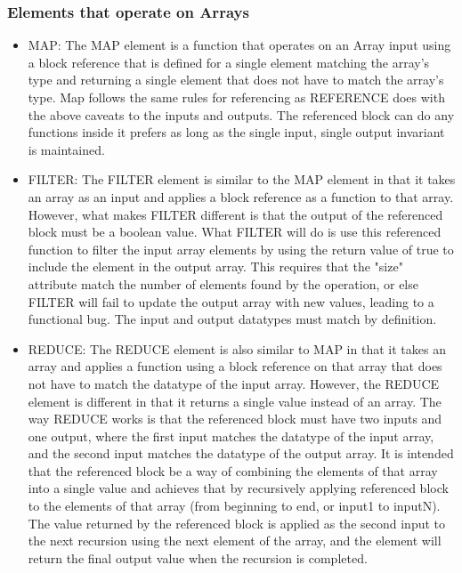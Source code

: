 \documentclass[titlepage]{article}
\begin{document}
\subsubsection{Elements that operate on Arrays}
\begin{itemize}[label={}]
    \item MAP:
The MAP element is a function that operates on an Array input using a block reference that is defined for a single element matching the array's type and returning a single element that does not have to match the array's type.
Map follows the same rules for referencing as REFERENCE does with the above caveats to the inputs and outputs.
The referenced block can do any functions inside it prefers as long as the single input, single output invariant is maintained.
    \item FILTER:
The FILTER element is similar to the MAP element in that it takes an array as an input and applies a block reference as a function to that array.
However, what makes FILTER different is that the output of the referenced block must be a boolean value.
What FILTER will do is use this referenced function to filter the input array elements by using the return value of true to include the element in the output array.
This requires that the "size" attribute match the number of elements found by the operation, or else FILTER will fail to update the output array with new values, leading to a functional bug.
The input and output datatypes must match by definition.
    \item REDUCE:
The REDUCE element is also similar to MAP in that it takes an array and applies a function using a block reference on that array that does not have to match the datatype of the input array.
However, the REDUCE element is different in that it returns a single value instead of an array.
The way REDUCE works is that the referenced block must have two inputs and one output, where the first input matches the datatype of the input array, and the second input matches the datatype of the output array.
It is intended that the referenced block be a way of combining the elements of that array into a single value and achieves that by recursively applying referenced block to the elements of that array (from beginning to end, or input1 to inputN).
The value returned by the referenced block is applied as the second input to the next recursion using the next element of the array, and the element will return the final output value when the recursion is completed.
\end{itemize}
\end{document}
